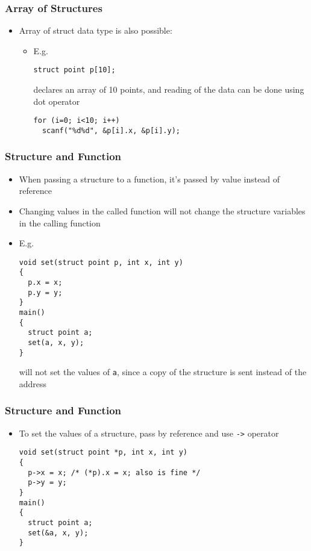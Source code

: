 \documentclass[11pt]{beamer}
\begin{document}
\begin{frame}[fragile]\frametitle{Array of Structures}
\label{sec-1-6}

\begin{itemize}
\item Array of struct data type is also possible:
\begin{itemize}
\item E.g. 

\begin{verbatim}
struct point p[10];
\end{verbatim}
   declares an array of 10 points, and reading of the data can be done using dot operator

\begin{verbatim}
for (i=0; i<10; i++)
  scanf("%d%d", &p[i].x, &p[i].y);
\end{verbatim}
\end{itemize}
\end{itemize}
\end{frame}
\begin{frame}[fragile]\frametitle{Structure and Function}
\label{sec-1-7}

\begin{itemize}
\item When passing a structure to a function, it's passed by value instead of reference
\item Changing values in the called function will not change the structure variables in the calling function
\item E.g.

\begin{verbatim}
void set(struct point p, int x, int y)
{
  p.x = x;
  p.y = y;
}
main()
{
  struct point a;
  set(a, x, y);
}
\end{verbatim}
  will not set the values of \verb~a~, since a copy of the structure is sent instead of the address
\end{itemize}
\end{frame}
\begin{frame}[fragile]\frametitle{Structure and Function}
\label{sec-1-8}

\begin{itemize}
\item To set the values of a structure, pass by reference and use \verb~->~ operator

\begin{verbatim}
void set(struct point *p, int x, int y)
{
  p->x = x; /* (*p).x = x; also is fine */
  p->y = y;
}
main()
{
  struct point a;
  set(&a, x, y);
}
\end{verbatim}
\end{itemize}
\end{frame}
\end{document}
